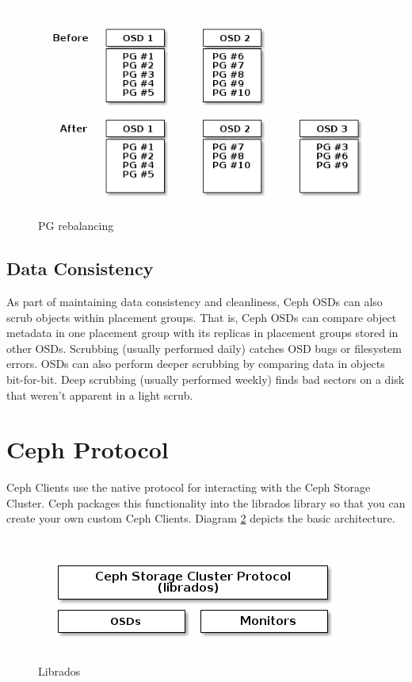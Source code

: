 \documentclass[12pt,a4paper]{report}
\begin{document}
\begin{figure}[h]
	\includegraphics[scale=0.60]{pg_rebalancing.png}
	\caption{PG rebalancing}
	\label{fig:pg_rebalancing}
\end{figure}

\subsection{Data Consistency}

As part of maintaining data consistency and cleanliness, Ceph OSDs can also
scrub objects within placement groups. That is, Ceph OSDs can compare object
metadata in one placement group with its replicas in placement groups stored in
other OSDs. Scrubbing (usually performed daily) catches OSD bugs or filesystem
errors. OSDs can also perform deeper scrubbing by comparing data in objects
bit-for-bit. Deep scrubbing (usually performed weekly) finds bad sectors on a
disk that weren't apparent in a light scrub.

\section{Ceph Protocol}

Ceph Clients use the native protocol for interacting with the Ceph Storage
Cluster. Ceph packages this functionality into the librados library so that you
can create your own custom Ceph Clients. Diagram \ref{fig:librados} depicts the
basic architecture.

\begin{figure}[h]
	\includegraphics[scale=0.60]{librados.png}
	\caption{Librados}
	\label{fig:librados}
\end{figure}
\end{document}
